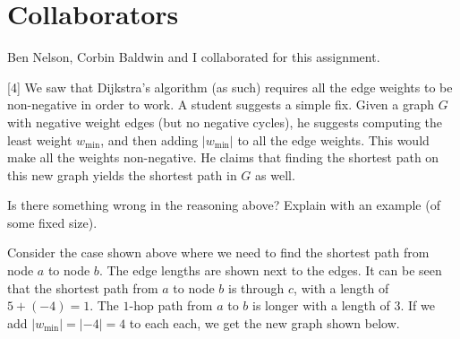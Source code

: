 \documentclass[addpoints]{exam}
\begin{document}
\section*{Collaborators}

Ben Nelson, Corbin Baldwin and I collaborated for this assignment.

\begin{questions}

[4]
We saw that Dijkstra's algorithm (as such) requires all the edge weights to be non-negative in order to work. A student suggests a simple fix. Given a graph $G$ with negative weight edges (but no negative cycles), he suggests computing the least weight $w_{\min}$, and then adding $|w_{\min}|$ to all the edge weights. This would make all the weights non-negative. He claims that finding the shortest path on this new graph yields the shortest path in $G$ as well.

Is there something wrong in the reasoning above? Explain with an example (of some fixed size).

\begin{center}
\end{center}

Consider the case shown above where we need to find the shortest path from node $a$ to node $b$. The edge lengths are shown next to the edges. It can be seen that the shortest path from $a$ to node $b$ is through $c$, with a length of $5+(-4)=1$. The $1$-hop path from $a$ to $b$ is longer with a length of $3$. If we add $|w_{\min}| = |-4| =4$ to each each, we get the new graph shown below.


\end{questions}
\end{document}
